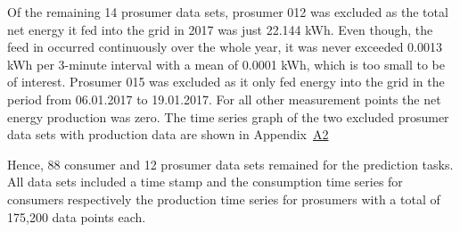 Of the remaining 14 prosumer data sets, prosumer 012 was excluded as the total net energy it fed into the grid in 2017 was just 22.144 kWh. Even though, the feed in occurred continuously over the whole year, it was never exceeded 0.0013 kWh per 3-minute interval with a mean of 0.0001 kWh, which is too small to be of interest. Prosumer 015 was excluded as it only fed energy into the grid in the period from 06.01.2017 to 19.01.2017. For all other measurement points the net energy production was zero. The time series graph of the two excluded prosumer data sets with production data are shown in Appendix~\hyperlink{AppA2:Figures:Excludedp}{A2}

Hence, 88 consumer and 12 prosumer data sets remained for the prediction tasks. All data sets included a time stamp and the consumption time series for consumers respectively the production time series for prosumers with a total of 175,200 data points each.


